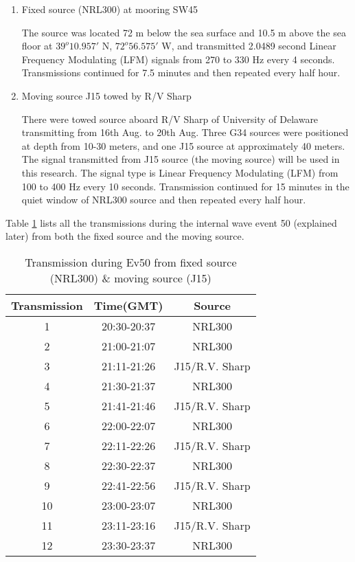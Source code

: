 \begin{enumerate}
\item Fixed source (NRL300) at mooring SW45

 The source was located 72 m below the sea surface and
10.5 m above the sea floor at $39^{o}10.957'$ N, $72^o56.575'$ W,
and transmitted 2.0489 second Linear Frequency Modulating (LFM)
signals from 270 to 330 Hz every 4 seconds. Transmissions continued
for 7.5 minutes and then repeated every half hour. 
\item Moving source J15 towed by R/V Sharp

There were towed source aboard R/V Sharp of University of Delaware transmitting from 16th Aug. to 20th Aug. Three G34 sources were positioned at depth from 10-30 meters, and one J15 source at approximately 40 meters. The signal transmitted from J15 source (the moving source) will be used in this research. The signal type is Linear Frequency Modulating (LFM) from 100 to 400 Hz every 10 seconds. Transmission continued for 15 minutes in the quiet window of NRL300 source and then repeated every half hour. 


\end{enumerate}
Table \ref{tab:ev50_trans} lists all the transmissions during the internal wave event 50 (explained later) from both the fixed source and the moving source.
\begin{table}
  \centering
  \caption{Transmission during Ev50 from fixed source (NRL300)
    \& moving source (J15)}\label{tab:ev50_trans}
  \begin{tabular}{ccc}
  \hline
  Transmission & Time(GMT) & Source\\
  \hline
  1 & 20:30-20:37 & NRL300\\
  2 &  21:00-21:07 &  NRL300\\
  3 & 21:11-21:26 & J15/R.V. Sharp\\
  4 & 21:30-21:37 & NRL300\\
  5 & 21:41-21:46 & J15/R.V. Sharp\\
  6 & 22:00-22:07 & NRL300\\
  7 & 22:11-22:26 & J15/R.V. Sharp\\
  8 & 22:30-22:37 & NRL300\\
  9 & 22:41-22:56 & J15/R.V. Sharp\\
  10 & 23:00-23:07 & NRL300\\
  11 & 23:11-23:16 & J15/R.V. Sharp\\
  12 & 23:30-23:37 & NRL300\\
  \hline
  \end{tabular}
\end{table}

